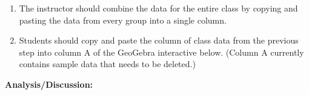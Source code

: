 \documentclass{ximera}
\begin{document}
\begin{enumerate}
\begin{center}
       \end{center}

\item The instructor should combine the data for the entire class by copying and pasting the data from every group into a single column.
\item Students should copy and paste the column of class data from the previous step into column A of the GeoGebra interactive below. (Column A currently contains sample data that needs to be deleted.)  
\end{enumerate}

\begin{onlineOnly}
\begin{center} 
\end{center}
\end{onlineOnly}



\textbf{Analysis/Discussion:}
\end{document}
